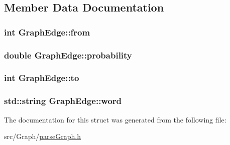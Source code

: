 \subsection{Member Data Documentation}
\hypertarget{struct_graph_edge_ad8b9f222e49fe17fe381f347ff7c7e81}{
\subsubsection[{from}]{\setlength{\rightskip}{0pt plus 5cm}int Graph\+Edge\+::from}}\label{struct_graph_edge_ad8b9f222e49fe17fe381f347ff7c7e81}
\hypertarget{struct_graph_edge_a56e516acce66767c94701a0c584b7100}{
\subsubsection[{probability}]{\setlength{\rightskip}{0pt plus 5cm}double Graph\+Edge\+::probability}}\label{struct_graph_edge_a56e516acce66767c94701a0c584b7100}
\hypertarget{struct_graph_edge_ad8e53c4ee2f5b3f45de08651dc4ce165}{
\subsubsection[{to}]{\setlength{\rightskip}{0pt plus 5cm}int Graph\+Edge\+::to}}\label{struct_graph_edge_ad8e53c4ee2f5b3f45de08651dc4ce165}
\hypertarget{struct_graph_edge_aea90e7ccd4ee11650f02385ed63268f9}{
\subsubsection[{word}]{\setlength{\rightskip}{0pt plus 5cm}std\+::string Graph\+Edge\+::word}}\label{struct_graph_edge_aea90e7ccd4ee11650f02385ed63268f9}


The documentation for this struct was generated from the following file\+:\begin{DoxyCompactItemize}
\item 
src/\+Graph/\hyperlink{parse_graph_8h}{parse\+Graph.\+h}\end{DoxyCompactItemize}
